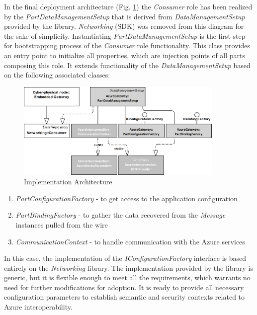 \documentclass{article}
\begin{document}

In the final deployment architecture (Fig. \ref*{figure4.ImplementationArchitecture}) the \textit{Consumer} role has been realized by the \textit{PartDataManagementSetup} that is derived from \textit{DataManagementSetup} provided by the library. \textit{Networking} (SDK) was removed from this diagram for the sake of simplicity. Instantiating \textit{PartDataManagementSetup} is the first step for bootstrapping process of the \textit{Consumer} role functionality. This class provides an entry point to initialize all properties, which are injection points of all parts composing this role. It extends functionality of the \textit{DataManagementSetup} based on the following associated classes:


\begin{figure}
      \centering
      \includegraphics[width=10cm]{../.Media/ImplementationArchitecture.png}
      \caption{Implementation Architecture}\label{figure4.ImplementationArchitecture}
\end{figure}

\begin{enumerate}
      \item \textit{PartConfigurationFactory} - to get access to the application configuration
      \item \textit{PartBindingFactory} - to gather the data recovered from the \textit{Message} instances pulled from the wire
      \item \textit{CommunicationContext} - to handle communication with the Azure services
\end{enumerate}

In this case, the implementation of the \textit{IConfigurationFactory} interface is based entirely on the \textit{Networking} library. The implementation provided by the library is generic, but it is flexible enough to meet all the requirements, which warrants no need for further modifications for adoption. It is ready to provide all necessary configuration parameters to establish semantic and security contexts related to Azure interoperability.
\end{document}

